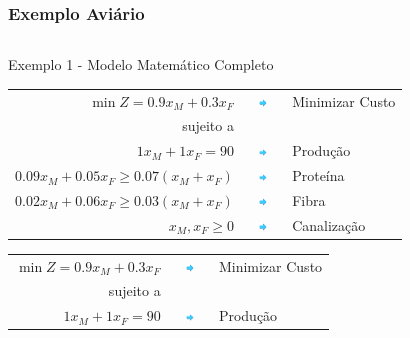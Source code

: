 \documentclass{beamer}
\begin{document}
\begin{frame}
	\frametitle{Exemplo Aviário}
	\begin{columns}
		\begin{column}{0.8\textwidth}
			\centering
			\begin{exampleblock}{Exemplo 1 - Modelo Matemático Completo}
				\centering
				\scriptsize
				\begin{table}
					{
					\begin{tabular}{r c l}
						$ \min Z = 0.9x_M+0.3x_F$ & \includegraphics[width=0.8cm,height=0.2cm]{seta2.png} & Minimizar Custo \\
						sujeito a & & \\
						$1x_M+1x_F = 90$ & \includegraphics[width=0.8cm,height=0.2cm]{seta2.png}& Produção \\
						$0.09x_M+0.05x_F \ge 0.07(x_M+x_F)$ & \includegraphics[width=0.8cm,height=0.2cm]{seta2.png}& Proteína \\
						$0.02x_M+0.06x_F \ge 0.03(x_M+x_F)$ & \includegraphics[width=0.8cm,height=0.2cm]{seta2.png}& Fibra \\
						$x_M, x_F \ge 0$ & \includegraphics[width=0.8cm,height=0.2cm]{seta2.png}& Canalização \\
					\end{tabular}
					}
					{
					\begin{tabular}{r c l}
						$ \min Z = 0.9x_M+0.3x_F$ & \includegraphics[width=0.8cm,height=0.2cm]{seta2.png} & Minimizar Custo \\
						sujeito a & & \\
						$1x_M+1x_F = 90$ & \includegraphics[width=0.8cm,height=0.2cm]{seta2.png}& Produção \\

\end{tabular}}
\end{table}
\end{exampleblock}
\end{column}
\end{columns}
\end{frame}
\end{document}
